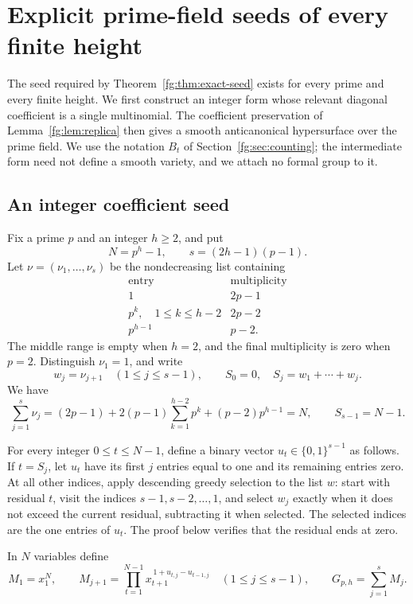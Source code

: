 \section{Explicit prime-field seeds of every finite height}\label{fg:sec:seeds}
The seed required by Theorem~\ref{fg:thm:exact-seed} exists for every
prime and every finite height. We first construct an integer form whose
relevant diagonal coefficient is a single multinomial. The coefficient
preservation of Lemma~\ref{fg:lem:replica} then gives a smooth
anticanonical hypersurface over the prime field. We use the notation
$B_t$ of Section~\ref{fg:sec:counting}; the intermediate form need not
define a smooth variety, and we attach no formal group to it.

\subsection{An integer coefficient seed}
Fix a prime $p$ and an integer $h\ge2$, and put
\[
 N=p^h-1,\qquad s=(2h-1)(p-1).
\]
Let $\nu=(\nu_1,\ldots,\nu_s)$ be the nondecreasing list containing
\[
 \begin{array}{c|c}
 \text{entry}&\text{multiplicity}\\ \hline
 1&2p-1\\
 p^k,\quad 1\le k\le h-2&2p-2\\
 p^{h-1}&p-2 .
 \end{array}
\]
The middle range is empty when $h=2$, and the final multiplicity is
zero when $p=2$. Distinguish $\nu_1=1$, and write
\[
 w_j=\nu_{j+1}\quad(1\le j\le s-1),\qquad
 S_0=0,\quad S_j=w_1+\cdots+w_j.
\]
We have
\begin{equation}\label{fg:eq:seed-weight}
 \sum_{j=1}^s\nu_j
 =(2p-1)+2(p-1)\sum_{k=1}^{h-2}p^k+(p-2)p^{h-1}
 =N,\qquad S_{s-1}=N-1.
\end{equation}

For every integer $0\le t\le N-1$, define a binary vector
$u_t\in\{0,1\}^{s-1}$ as follows. If $t=S_j$, let $u_t$ have its first
$j$ entries equal to one and its remaining entries zero. At all other
indices, apply descending greedy selection to the list $w$: start with
residual $t$, visit the indices $s-1,s-2,\ldots,1$, and select $w_j$
exactly when it does not exceed the current residual, subtracting it
when selected. The selected indices are the one entries of $u_t$.
The proof below verifies that the residual ends at zero.

In $N$ variables define
\begin{equation}\label{fg:eq:seed-monomials}
 M_1=x_1^N,\qquad
 M_{j+1}=\prod_{t=1}^{N-1}
       x_{t+1}^{\,1+u_{t,j}-u_{t-1,j}}\quad(1\le j\le s-1),
 \qquad G_{p,h}=\sum_{j=1}^sM_j.
\end{equation}

